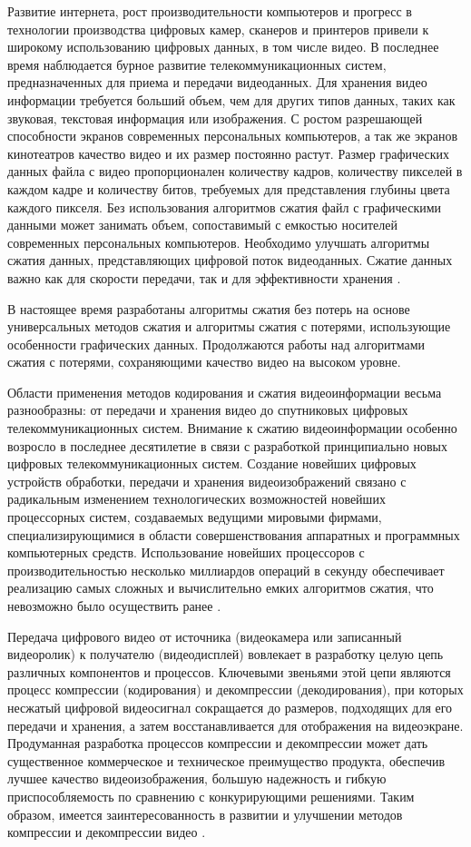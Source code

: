 \Introduction

Развитие интернета, рост производительности компьютеров и прогресс в технологии 
производства цифровых камер, сканеров и принтеров привели к широкому использованию 
цифровых данных, в том числе видео. В последнее время наблюдается бурное развитие 
телекоммуникационных систем, предназначенных для приема и передачи 
видеоданных. 
Для хранения видео информации требуется 
больший объем, чем для других типов данных, таких как звуковая, текстовая информация или изображения. 
С ростом разрешающей способности экранов современных персональных компьютеров, а так же экранов кинотеатров
качество видео и их размер постоянно растут. 
Размер графических данных файла с видео пропорционален количеству кадров, количеству пикселей в 
каждом кадре и количеству битов, требуемых для представления глубины цвета каждого пикселя. 
Без использования алгоритмов сжатия файл с графическими данными может занимать объем, сопоставимый с 
емкостью носителей современных персональных компьютеров. 
Необходимо улучшать алгоритмы сжатия данных, представляющих цифровой поток видеоданных. 
Сжатие данных важно как для скорости передачи, так и для эффективности хранения \cite{Pup03}.

В настоящее время разработаны алгоритмы сжатия без потерь на основе универсальных 
методов сжатия и алгоритмы сжатия с потерями, использующие особенности графических 
данных. Продолжаются работы над алгоритмами сжатия с потерями, сохраняющими качество 
видео на высоком уровне.

Области применения методов кодирования и сжатия видеоинформации весьма разнообразны:
от передачи и хранения видео до спутниковых цифровых телекоммуникационных систем. 
Внимание к сжатию видеоинформации особенно возросло в последнее десятилетие в связи с 
разработкой принципиально новых цифровых телекоммуникационных систем. Создание новейших
цифровых устройств обработки, передачи и хранения видеоизображений связано с радикальным
изменением технологических возможностей новейших процессорных систем, создаваемых ведущими
мировыми фирмами, специализирующимися в области совершенствования аппаратных и программных 
компьютерных средств. Использование новейших процессоров с производительностью несколько 
миллиардов операций в секунду обеспечивает реализацию самых сложных и вычислительно емких 
алгоритмов сжатия, что невозможно было осуществить ранее \cite{Pup07}. 

Передача цифрового видео от источника (видеокамера или записанный 
видеоролик) к получателю (видеодисплей) вовлекает в разработку целую цепь 
различных компонентов и процессов. Ключевыми звеньями этой цепи являются 
процесс компрессии (кодирования) и декомпрессии (декодирования), при 
которых несжатый цифровой видеосигнал сокращается до размеров, 
подходящих для его передачи и хранения, а затем восстанавливается для 
отображения на видеоэкране. 
Продуманная разработка процессов компрессии и декомпрессии может 
дать существенное коммерческое и техническое преимущество продукта, 
обеспечив лучшее качество видеоизображения, большую надежность и гибкую 
приспособляемость по сравнению с конкурирующими решениями. 
Таким образом, имеется заинтересованность в развитии и 
улучшении методов компрессии и декомпрессии видео \cite{Pup13}.